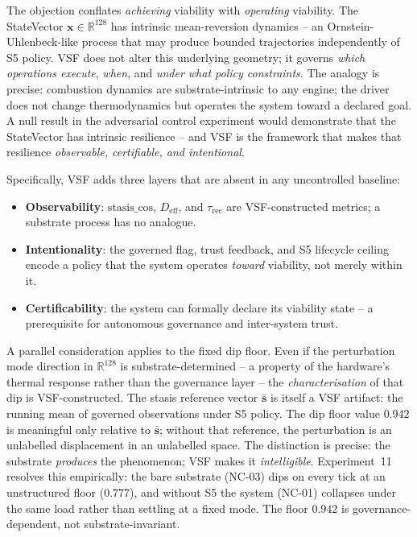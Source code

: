 \documentclass[11pt, a4paper]{article}
\begin{document}
The objection conflates \emph{achieving} viability with \emph{operating}
viability.
The StateVector $\mathbf{x} \in \mathbb{R}^{128}$ has intrinsic mean-reversion
dynamics -- an Ornstein-Uhlenbeck-like process that may produce bounded
trajectories independently of S5 policy.
VSF does not alter this underlying geometry; it governs \emph{which operations
execute}, \emph{when}, and \emph{under what policy constraints}.
The analogy is precise: combustion dynamics are substrate-intrinsic to any
engine; the driver does not change thermodynamics but operates the system toward
a declared goal.
A null result in the adversarial control experiment would demonstrate that the
StateVector has intrinsic resilience -- and VSF is the framework that makes that
resilience \emph{observable, certifiable, and intentional}.

Specifically, VSF adds three layers that are absent in any uncontrolled baseline:
\begin{itemize}
  \item \textbf{Observability}: $\text{stasis\_cos}$, $D_\text{eff}$, and
        $\tau_\text{rec}$ are VSF-constructed metrics; a substrate process has
        no analogue.
  \item \textbf{Intentionality}: the governed flag, trust feedback, and S5
        lifecycle ceiling encode a policy that the system operates \emph{toward}
        viability, not merely within it.
  \item \textbf{Certificability}: the system can formally declare its viability
        state -- a prerequisite for autonomous governance and inter-system trust.
\end{itemize}

A parallel consideration applies to the fixed dip floor.
Even if the perturbation mode direction in $\mathbb{R}^{128}$ is
substrate-determined -- a property of the hardware's thermal response rather
than the governance layer -- the \emph{characterisation} of that dip is
VSF-constructed.
The stasis reference vector $\bar{\mathbf{s}}$ is itself a VSF artifact:
the running mean of governed observations under S5 policy.
The dip floor value $0.942$ is meaningful only relative to $\bar{\mathbf{s}}$;
without that reference, the perturbation is an unlabelled displacement in an
unlabelled space.
The distinction is precise: the substrate \emph{produces} the phenomenon;
VSF makes it \emph{intelligible}.
Experiment~11 resolves this empirically: the bare substrate (NC-03) dips on
every tick at an unstructured floor ($0.777$), and without S5 the system
(NC-01) collapses under the same load rather than settling at a fixed mode.
The floor $0.942$ is governance-dependent, not substrate-invariant.
\end{document}
